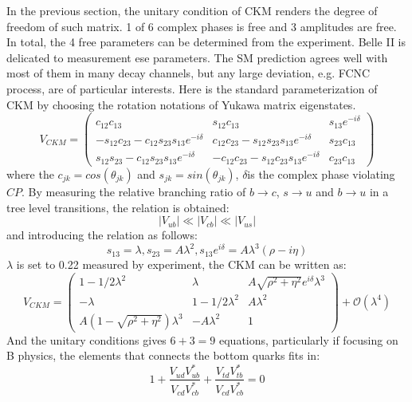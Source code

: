 In the previous section, the unitary condition of CKM renders the degree of freedom of such matrix. 1 of 6 complex phases is free and 3 amplitudes are free. In total, the 4 free parameters can be determined from the experiment. Belle II is delicated to measurement ese parameters. The SM prediction agrees well with most of them in many decay channels, but any large deviation, e.g. FCNC process, are of particular interests. Here is the standard parameterization of CKM by choosing the rotation notations of Yukawa matrix eigenstates. 
\begin{equation}
V_{CKM}=
\begin{pmatrix}
c_{12}c_{13} & s_{12}c_{13} & s_{13}e^{-i\delta }\\
-s_{12}c_{23}-c_{12}s_{23}s_{13}e^{-i\delta } &c_{12}c_{23}-s_{12}s_{23}s_{13}e^{-i\delta } & s_{23}c_{13}\\
s_{12}s_{23}-c_{12}s_{23}s_{13}e^{-i\delta }  & -c_{12}c_{23}-s_{12}c_{23}s_{13}e^{-i\delta } & c_{23}c_{13}
\end{pmatrix}
\end{equation}
where the $c_{jk}=cos(\theta_{jk})$ and $s_{jk}=sin(\theta_{jk})$, $\delta$is the complex phase violating $CP$. By measuring the relative branching ratio of $b\to c$, $s\to u$ and $b\to u$ in a tree level transitions, the relation is obtained: 
\begin{equation}
|V_{ub}|\ll |V_{cb}|\ll |V_{us}|
\end{equation}
and introducing the relation as follows:
\begin{equation}
s_{13}=\lambda , s_{23}=A\lambda^2, s_{13}e^{i\delta}=A\lambda^3(\rho-i\eta)
\end{equation}
$\lambda$ is set to 0.22 measured by experiment, the CKM can be written as: 
\begin{equation}
V_{CKM}=
\begin{pmatrix}
1-1/2\lambda^2 & \lambda & A\sqrt{\rho^2+\eta^2}e^{i\delta}\lambda^3\\
-\lambda & 1-1/2\lambda^2 & A\lambda^2\\
A(1-\sqrt{\rho^2+\eta^2})\lambda^3& -A\lambda^2 & 1
\end{pmatrix}+\mathcal{O}(\lambda^4)
\end{equation}
And the unitary conditions gives $6 + 3 = 9$ equations, particularly if focusing on B physics, the elements that connects the bottom quarks fits in: 
\begin{equation}
1+
\frac{V_{ud}V^*_{ub}}{V_{cd}V^*_{cb}}+
\frac{V_{td}V^*_{tb}}{V_{cd}V^*_{cb}}
=0
\end{equation}
